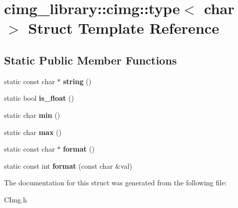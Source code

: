 \hypertarget{structcimg__library_1_1cimg_1_1type_3_01char_01_4}{\section{cimg\-\_\-library\-:\-:cimg\-:\-:type$<$ char $>$ Struct Template Reference}
\label{structcimg__library_1_1cimg_1_1type_3_01char_01_4}
}
\subsection*{Static Public Member Functions}
\begin{DoxyCompactItemize}
\item 
\hypertarget{structcimg__library_1_1cimg_1_1type_3_01char_01_4_a1c0d0211aac323adb78d53ef372cf9dc}{static const char $\ast$ {\bfseries string} ()}\label{structcimg__library_1_1cimg_1_1type_3_01char_01_4_a1c0d0211aac323adb78d53ef372cf9dc}

\item 
\hypertarget{structcimg__library_1_1cimg_1_1type_3_01char_01_4_a23da7b377cce5a77cd93da163b3e2405}{static bool {\bfseries is\-\_\-float} ()}\label{structcimg__library_1_1cimg_1_1type_3_01char_01_4_a23da7b377cce5a77cd93da163b3e2405}

\item 
\hypertarget{structcimg__library_1_1cimg_1_1type_3_01char_01_4_a8d9601354495d1e33f11da6d82770b20}{static char {\bfseries min} ()}\label{structcimg__library_1_1cimg_1_1type_3_01char_01_4_a8d9601354495d1e33f11da6d82770b20}

\item 
\hypertarget{structcimg__library_1_1cimg_1_1type_3_01char_01_4_a7e829821be9d4800f4121ad3b5867861}{static char {\bfseries max} ()}\label{structcimg__library_1_1cimg_1_1type_3_01char_01_4_a7e829821be9d4800f4121ad3b5867861}

\item 
\hypertarget{structcimg__library_1_1cimg_1_1type_3_01char_01_4_ab5959080f704952da497c9dc56e25359}{static const char $\ast$ {\bfseries format} ()}\label{structcimg__library_1_1cimg_1_1type_3_01char_01_4_ab5959080f704952da497c9dc56e25359}

\item 
\hypertarget{structcimg__library_1_1cimg_1_1type_3_01char_01_4_a1d92a5d92b1933eeadae29759a2fb80d}{static const int {\bfseries format} (const char \&val)}\label{structcimg__library_1_1cimg_1_1type_3_01char_01_4_a1d92a5d92b1933eeadae29759a2fb80d}

\end{DoxyCompactItemize}


The documentation for this struct was generated from the following file\-:\begin{DoxyCompactItemize}
\item 
C\-Img.\-h\end{DoxyCompactItemize}
